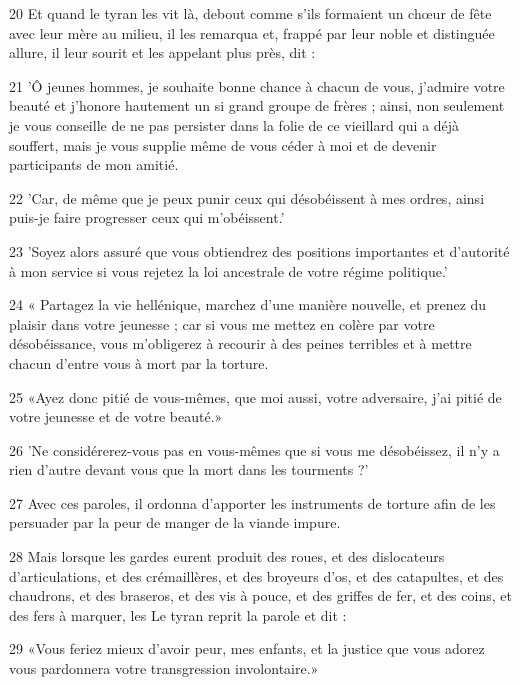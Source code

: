 \par 20 Et quand le tyran les vit là, debout comme s'ils formaient un chœur de fête avec leur mère au milieu, il les remarqua et, frappé par leur noble et distinguée allure, il leur sourit et les appelant plus près, dit :

\par 21 'Ô jeunes hommes, je souhaite bonne chance à chacun de vous, j'admire votre beauté et j'honore hautement un si grand groupe de frères ; ainsi, non seulement je vous conseille de ne pas persister dans la folie de ce vieillard qui a déjà souffert, mais je vous supplie même de vous céder à moi et de devenir participants de mon amitié.

\par 22 'Car, de même que je peux punir ceux qui désobéissent à mes ordres, ainsi puis-je faire progresser ceux qui m'obéissent.'

\par 23 'Soyez alors assuré que vous obtiendrez des positions importantes et d'autorité à mon service si vous rejetez la loi ancestrale de votre régime politique.'

\par 24 « Partagez la vie hellénique, marchez d'une manière nouvelle, et prenez du plaisir dans votre jeunesse ; car si vous me mettez en colère par votre désobéissance, vous m'obligerez à recourir à des peines terribles et à mettre chacun d'entre vous à mort par la torture.

\par 25 «Ayez donc pitié de vous-mêmes, que moi aussi, votre adversaire, j'ai pitié de votre jeunesse et de votre beauté.»

\par 26 'Ne considérerez-vous pas en vous-mêmes que si vous me désobéissez, il n'y a rien d'autre devant vous que la mort dans les tourments ?'

\par 27 Avec ces paroles, il ordonna d'apporter les instruments de torture afin de les persuader par la peur de manger de la viande impure.

\par 28 Mais lorsque les gardes eurent produit des roues, et des dislocateurs d'articulations, et des crémaillères, et des broyeurs d'os, et des catapultes, et des chaudrons, et des braseros, et des vis à pouce, et des griffes de fer, et des coins, et des fers à marquer, les Le tyran reprit la parole et dit :

\par 29 «Vous feriez mieux d'avoir peur, mes enfants, et la justice que vous adorez vous pardonnera votre transgression involontaire.»

